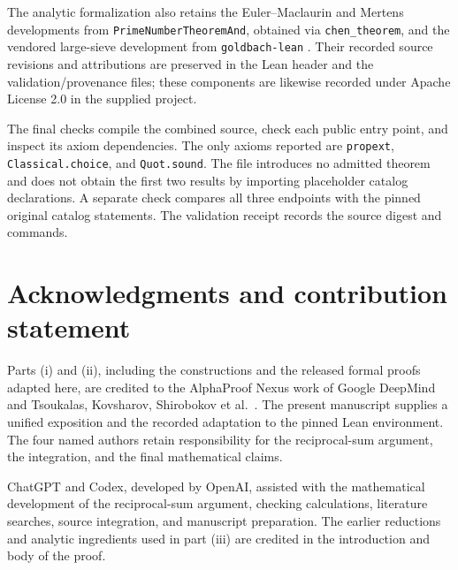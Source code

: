 The analytic formalization also retains the Euler--Maclaurin and
Mertens developments from \texttt{PrimeNumberTheoremAnd}, obtained via
\texttt{chen\_theorem}, and the vendored large-sieve development from
\texttt{goldbach-lean} \cite{PNTCode,GoldbachCode}. Their recorded source
revisions and attributions are preserved in the Lean header and the
validation/provenance files; these components are likewise recorded under
Apache License 2.0 in the supplied project.

The final checks compile the combined source, check each public entry
point, and inspect its axiom dependencies. The only axioms reported are
\texttt{propext}, \texttt{Classical.choice}, and \texttt{Quot.sound}.
The file introduces no admitted theorem and does not obtain the first
two results by importing placeholder catalog declarations. A separate
check compares all three endpoints with the pinned original catalog
statements. The validation receipt records the source digest and commands.

\section*{Acknowledgments and contribution statement}

Parts (i) and (ii), including the constructions and the released formal
proofs adapted here, are credited to the AlphaProof Nexus work of
Google DeepMind and Tsoukalas, Kovsharov, Shirobokov et al.\ \cite{TKS}.
The present manuscript supplies a unified exposition and the recorded
adaptation to the pinned Lean environment. The four named authors retain
responsibility for the reciprocal-sum argument, the integration, and the
final mathematical claims.

ChatGPT and Codex, developed by OpenAI, assisted with the mathematical
development of the reciprocal-sum argument, checking calculations,
literature searches, source integration, and manuscript preparation.
The earlier reductions and analytic ingredients used in part (iii)
are credited in the introduction and body of the proof.

